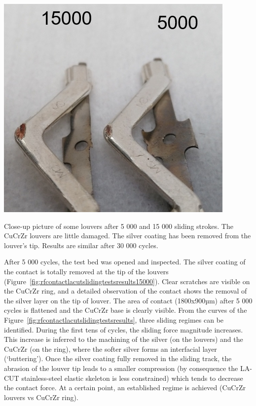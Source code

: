 {\begin{marginfigure}
	\centering
	\includegraphics[width=1.0\linewidth]{figures/chap3/RF_contacts/RF_contact_LACUT_sliding_tests_results_15000}
	\caption{Close-up picture of some louvers after 5 000 and 15 000 sliding strokes. The CuCrZr louvers are little damaged. The silver coating has been removed from the louver's tip. Results are similar after 30 000 cycles.}
	\label{fig:rfcontactlacutslidingtestsresults15000}
\end{marginfigure}

After 5 000 cycles, the test bed was opened and inspected. The silver coating of the contact is totally removed at the tip of the louvers (Figure~\ref{fig:rfcontactlacutslidingtestsresults15000}). Clear scratches are visible on the CuCrZr ring, and a detailed observation of the contact shows the removal of the silver layer on the tip of louver. The area of contact (1800x900µm) after 5 000 cycles is flattened and the CuCrZr base is clearly visible. From the curves of the Figure~\ref{fig:rfcontactlacutslidingtestsresults}, three sliding regimes can be identified. During the first tens of cycles, the sliding force magnitude increases. This increase is inferred to the machining of the silver (on the louvers) and the CuCrZr (on the ring), where the softer silver forms an interfacial layer (‘buttering’). Once the silver coating fully removed in the sliding track, the abrasion of the louver tip leads to a smaller compression (by consequence the LA-CUT stainless-steel elastic skeleton is less constrained) which tends to decrease the contact force. At a certain point, an established regime is achieved (CuCrZr louvers vs CuCrZr ring).  

}
